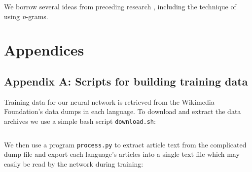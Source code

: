 \documentclass{article}
\begin{document}
We borrow several ideas from preceding research \cite{langidstanford}, including the technique of using \textit{n}-grams.

\section{Appendices}

\label{sec:appendix_a}
\subsection{Appendix A: Scripts for building training data}
Training data for our neural network is retrieved from the Wikimedia Foundation's data dumps in each language. To download and extract the data archives we use a simple bash script \texttt{download.sh}:
\inputminted{bash}{data/download.sh}
We then use a program \texttt{process.py} to extract article text from the complicated dump file and export each language's articles into a single text file which may easily be read by the network during training:
\inputminted{python}{data/process.py}


\end{document}
